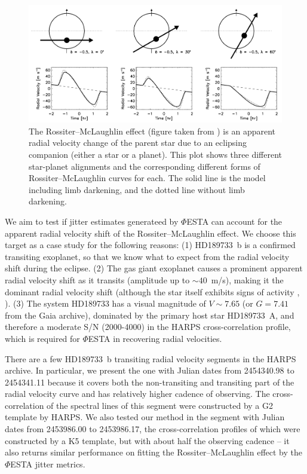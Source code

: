 \begin{figure}[htbp]
\centering
\includegraphics[width = 0.80 \linewidth]
{./Figures/Methods/rmeffect.png}
\caption[The Rossiter–McLaughlin effect]
{The Rossiter–McLaughlin effect (figure taken from \cite{Gaudi2007}) is an apparent radial velocity change of the parent star due to an eclipsing companion (either a star or a planet). This plot shows three different star-planet alignments and the corresponding different forms of Rossiter–McLaughlin curves for each. The solid line is the model including limb darkening, and the dotted line without limb darkening.}
\label{fig:rm-effect}
\end{figure} 

We aim to test if jitter estimates generateed by $\mathit{\Phi}$ESTA can account for the apparent radial velocity shift of the Rossiter–McLaughlin effect. We choose this target as a case study for the following reasons: (1) HD189733~b is a confirmed transiting exoplanet, so that we know what to expect from the radial velocity shift during the eclipse. (2) The gas giant exoplanet causes a prominent apparent radial velocity shift as it transits (amplitude up to $\sim 40$~m/s), making it the dominant radial velocity shift (although the star itself exhibits signs of activity \cite{Boisse189733}, \cite{Cauley2017}). (3) The system HD189733 has a visual magnitude of $V\sim7.65$ \cite{SIMBAD189733} (or $G=7.41$ from the Gaia archive), dominated by the primary host star HD189733~A, and therefore a moderate S/N (2000-4000) in the HARPS cross-correlation profile, which is required for $\mathit{\Phi}$ESTA in recovering radial velocities.

There are a few HD189733~b transiting radial velocity segments in the HARPS archive. In particular, we present the one with Julian dates from 2454340.98 to 2454341.11 because it covers both the non-transiting and transiting part of the radial velocity curve and has relatively higher cadence of observing. The cross-correlation of the spectral lines of this segment were constructed by a G2 template by HARPS. We also tested our method in the segment with Julian dates from 2453986.00 to 2453986.17, the cross-correlation profiles of which were constructed by a K5 template, but with about half the observing cadence -- it also returns similar performance on fitting the Rossiter–McLaughlin effect by the $\mathit{\Phi}$ESTA jitter metrics.

